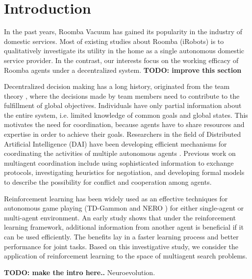 \documentclass[conference]{IEEEtran}
\begin{document}
\section{Introduction}
In the past years, Roomba Vacuum has gained its popularity in the industry of
domestic services.  Most of existing studies about Roomba (iRobots) is to 
qualitatively investigate its utility in the home as a single autonomous
domestic service provider. In the contrast, our interests focus on the working
efficacy of Roomba agents under a decentralized system. 
\textbf{TODO: improve this section}

Decentralized decision making has a long history, originated from the team
theory \cite{marschak1955elements, radner1962team,
    radner1959application, ho1972team, tsitsiklis1985complexity},
where the decisions made by team members need to contribute to the fulfillment
of global objectives. Individuals have only partial
information about the entire system, i.e. limited knowledge of common goals
and global states. This motivates the need for coordination, because agents
have to share resources and expertise in order to achieve their goals.
Researchers in the field of Distributed Artificial Intelligence (DAI) have
been developing efficient mechanisms for coordinating the activities of multiple
autonomous agents \cite{weiss1999multiagent, huhns2012distributed}. 
Previous work on multiagent coordination 
include using sophisticated information to exchange protocols, investigating
heuristics for negotiation, and developing formal models to describe the
possibility for conflict and cooperation among agents. 

Reinforcement learning has been widely used as an effective techniques for
autonomous game playing (TD-Gammon \cite{tesauro1994td} and NERO
\cite{stanley2005real}) for either single-agent or multi-agent environment. 
An early study \cite{tan1993multi} shows that under the reinforcement learning
framework, additional information from another agent is beneficial if it
can be used efficiently. The benefits lay in a faster learning process and better performance for joint tasks.  
Based on this investigative study, we consider the application of reinforcement learning to the space of multiagent search problems.

\textbf{TODO: make the intro here..}
Neuroevolution.
\end{document}
